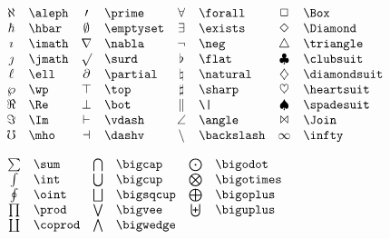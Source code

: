 \documentclass{article}
\begin{document}
    \begin{math}
        \begin{array}{clclclcl}
            \aleph & \verb=\aleph= & \prime & \verb=\prime= & \forall & \verb=\forall= & \Box & \verb=\Box= \\
            \hbar & \verb=\hbar= & \emptyset & \verb=\emptyset= & \exists & \verb=\exists= & \Diamond & \verb=\Diamond= \\
            \imath & \verb=\imath= & \nabla & \verb=\nabla= & \neg & \verb=\neg= & \triangle & \verb=\triangle= \\
            \jmath & \verb=\jmath= & \surd & \verb=\surd= & \flat & \verb=\flat= & \clubsuit & \verb=\clubsuit= \\
            \ell & \verb=\ell= & \partial & \verb=\partial= & \natural & \verb=\natural= & \diamondsuit & \verb=\diamondsuit= \\
            \wp & \verb=\wp= & \top & \verb=\top= & \sharp & \verb=\sharp= & \heartsuit & \verb=\heartsuit= \\
            \Re & \verb=\Re= & \bot & \verb=\bot= & \| & \verb=\|= & \spadesuit & \verb=\spadesuit= \\
            \Im & \verb=\Im= & \vdash & \verb=\vdash= & \angle & \verb=\angle= & \Join & \verb=\Join= \\
            \mho & \verb=\mho= & \dashv & \verb=\dashv= & \backslash & \verb=\backslash= & \infty & \verb=\infty= \\
        \end{array}
    \end{math}

    \begin{math}
        \begin{array}{clclcl}
            \sum & \verb=\sum= & \bigcap & \verb=\bigcap= & \bigodot & \verb=\bigodot= \\
            \int & \verb=\int= & \bigcup & \verb=\bigcup= & \bigotimes & \verb=\bigotimes= \\
            \oint & \verb=\oint= & \bigsqcup & \verb=\bigsqcup= & \bigoplus & \verb=\bigoplus= \\
            \prod & \verb=\prod= & \bigvee & \verb=\bigvee= & \biguplus & \verb=\biguplus= \\
            \coprod & \verb=\coprod= & \bigwedge & \verb=\bigwedge= \\
        \end{array}
    \end{math}
\end{document}
